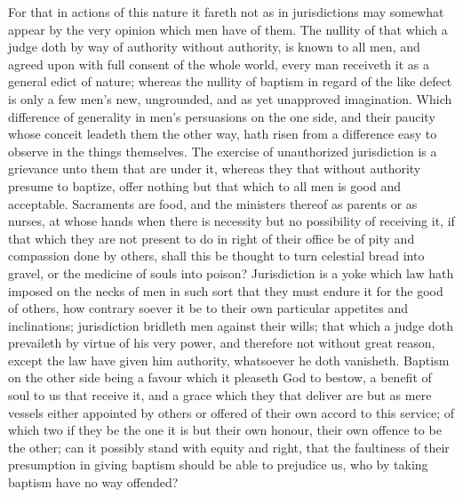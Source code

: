 For that in actions of this nature it fareth not as in jurisdictions may somewhat appear by the very opinion which men have of them. The nullity of that which a judge doth by way of authority without authority, is known to all men, and agreed upon with full consent of the whole world, every man receiveth it as a general edict of nature; whereas the nullity of baptism in regard of the like defect is only a few men’s new, ungrounded, and as yet unapproved imagination. Which difference of generality in men’s persuasions on the one side, and their paucity whose conceit leadeth them the other way, hath risen from a difference easy to observe in the things themselves. The exercise of unauthorized jurisdiction is a grievance unto them that are under it, whereas they that without authority presume to baptize, offer nothing but that which to all men is good and acceptable. Sacraments are food, and the ministers thereof as parents or as nurses, at whose hands when there is necessity but no possibility of receiving it, if that which they are not present to do in right of their office be of pity and compassion done by others, shall this be thought to turn celestial bread into gravel, or the medicine of souls into poison? Jurisdiction is a yoke which law hath imposed on the necks of men in such sort that they must endure it for the good of others, how contrary soever it be to their own particular appetites and inclinations; jurisdiction bridleth men against their wills; that which a judge doth prevaileth by virtue of his very power, and therefore not without great reason, except the law have given him authority,  whatsoever he doth vanisheth. Baptism on the other side being a favour which it pleaseth God to bestow, a benefit of soul to us that receive it, and a grace which they that deliver are but as mere vessels either appointed by others or offered of their own accord to this service; of which two if they be the one it is but their own honour, their own offence to be the other; can it possibly stand with equity and right, that the faultiness of their presumption in giving baptism should be able to prejudice us, who by taking baptism have no way offended?
